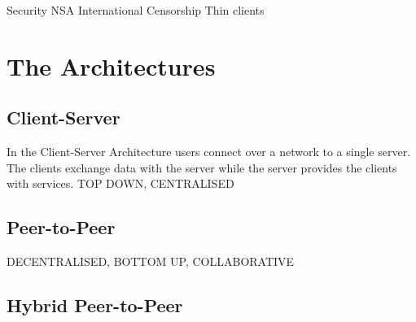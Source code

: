 \documentclass[12pt]{amsart}
\begin{document}
Security
NSA
International
Censorship
Thin clients



\section{The Architectures}
\subsection{Client-Server}

In the Client-Server Architecture users connect over a network to a single server. The clients exchange data with the server while the server provides the clients with services. TOP DOWN, CENTRALISED

\subsection{Peer-to-Peer}
DECENTRALISED, BOTTOM UP, COLLABORATIVE

\subsection{Hybrid Peer-to-Peer}
\end{document}
